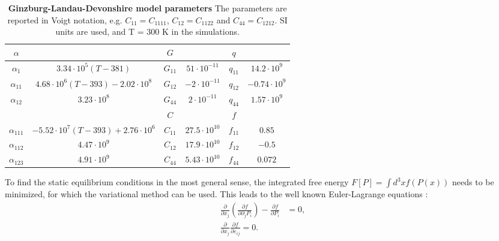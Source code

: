 \begin{table}
\begin{tabular}{|c|c|c|c|c|c|}
	\hline
	 $\alpha$ & & $G$ & & $q$ &\\
	 \hline
	 $\alpha_1$ & $3.34\cdot 10^5 (T - 381)$  & $G_{11}$ & $51 \cdot 10^{-11}$ & $q_{11}$ & $14.2 \cdot 10^{9}$ \\
	 $\alpha_{11}$ & $4.68 \cdot 10^6 (T-393) - 2.02 \cdot 10^8$ & $G_{12}$ & $-2 \cdot 10^{-11}$ & $q_{12}$ & $-0.74 \cdot 10^{9}$ \\
	 $\alpha_{12}$ & $3.23 \cdot 10^8$ & $G_{44}$ & $2 \cdot 10^{-11}$  & $q_{44}$ & $1.57 \cdot 10^{9}$ \\
	 \cline{3-6}
	 & & $C$ & & $f$ &\\
	 \cline{3-6}
	 $\alpha_{111}$ & $-5.52 \cdot 10^7 (T - 393) + 2.76 \cdot 10^6 $ & $C_{11}$ & $27.5 \cdot 10^{10}$ & $f_{11}$ & $0.85$ \\
	 $\alpha_{112}$ &  $4.47 \cdot 10^9 $ & $C_{12}$ & $17.9 \cdot 10^{10}$ & $f_{12}$ & $-0.5$  \\
	 $\alpha_{123}$ & $4.91 \cdot 10^9$ &$C_{44}$ & $5.43 \cdot 10^{10}$ & $f_{44}$ & $ 0.072$ \\
	 \hline
\end{tabular}
\caption{{\bf Ginzburg-Landau-Devonshire model parameters} The parameters are reported in Voigt notation, e.g. $C_{11} = C_{1111}$, $C_{12} = C_{1122}$ and $C_{44}= C_{1212}$.  SI units are used, and T = 300 K in the simulations.\label{tab:BTO_param}}
\end{table}

To find the static equilibrium conditions in the most general sense, the integrated free energy $F[P] = \int d^3x f(P(x))$ needs to be minimized, for which the variational method can be used.
This leads to the well known Euler-Lagrange equations \cite{Cao1991, Marton2010}:
\begin{align}
	\label{eq:BTO_euler}
	\frac{\partial}{\partial x_j}\left( \frac{\partial f}{\partial \partial_j P_i}\right) - \frac{\partial f}{\partial P_i} &= 0, \\
	\frac{\partial}{\partial x_j}\frac{\partial f}{\partial \varepsilon_{ij}} = 0.
\end{align}

